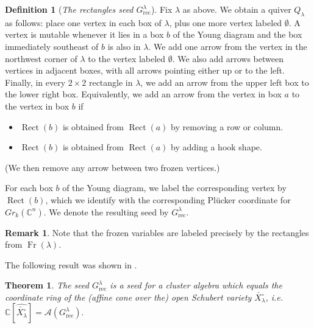 \documentclass{amsart}
\newtheorem{theorem}[thm]{Theorem}
\theoremstyle{definition}
\newtheorem{definition}[thm]{Definition}
\newtheorem{remark}[thm]{Remark}
\numberwithin{equation}{section}
\newcommand{\rect}{\mathrm{rec}}
\def\Rect{\operatorname{Rect}}
\newcommand{\C}{\mathbb{C}}
\newcommand{\Fr}{\operatorname{Fr}}
\newcommand{\openSchub}{{X_{\lambda}^{\circ}}}
\begin{document}
\begin{definition}[\emph{The rectangles seed $G_{\rect}^{\lambda}$}]\label{def:rectseed}
Fix $\lambda$ as above.
	We obtain a quiver $Q_{\lambda}$ as follows: place one vertex in each box of $\lambda$, plus one
more vertex labeled $\emptyset$. A vertex is mutable whenever it lies in a box $b$ of the Young diagram
and the box immediately southeast of $b$ is also in $\lambda$. 
We add one arrow from the vertex in the northwest corner of $\lambda$ to the vertex labeled $\emptyset$.
We also add arrows between vertices in adjacent boxes, with all arrows pointing either up or to the left. Finally, in every $2 \times 2$ rectangle in $\lambda$, we add an arrow from the upper left box to the lower right box. Equivalently, we add an arrow from the vertex in box $a$ to the vertex in box $b$ if  
\begin{itemize}
\item $\Rect(b)$ is obtained from $\Rect(a)$ by removing a row or column.
\item $\Rect(b)$ is obtained from $\Rect(a)$ by adding a hook shape.
\end{itemize}
(We then remove any arrow between two frozen vertices.)

For each box $b$ of the Young diagram, we label the 
corresponding vertex by $\Rect(b)$, which we identify with the 
corresponding Pl\"ucker coordinate for $Gr_k(\C^n)$.  We denote
	the resulting seed by $G_{\rect}^{\lambda}$.
\end{definition}  

\begin{remark}
Note that the frozen variables are labeled precisely
	by the rectangles from $\Fr(\lambda)$.
\end{remark}

The following result was shown in \cite{SSW}.

\begin{theorem}\cite{SSW}\label{thm:rectangles}
The seed $G^{\lambda}_{\rect}$ is
a seed for a cluster algebra which equals the coordinate ring of the 
(affine cone over the) open Schubert variety $\check \openSchub$, i.e. 
$\C[\widehat{\check \openSchub}]= 
\mathcal{A}(G^{\lambda}_{\rect}).$ 
\end{theorem}
\end{document}

